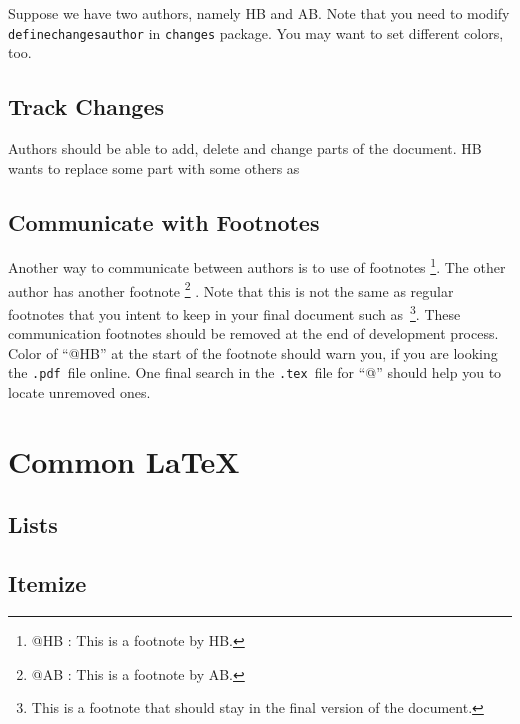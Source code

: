 \documentclass[pre,twocolumn,showkeys,longbibliography]{revtex4-1}
\makeatletter
\newcommand{\hCode}[1]{\texttt{#1}}
\newcommand{\hbFootnote}[2]{\footnote{{\color{red} @#1 : }#2}}
\theoremstyle{plain}
\theoremstyle{definition}
\theoremstyle{remark}
\newcommand{\hbDTex}{\hCode{.tex}}
\newcommand{\hbDPdf}{\hCode{.pdf}}
\makeatother
\begin{document}
Suppose we have two authors, namely HB and AB.
Note that you need to modify 
\hCode{definechangesauthor}
in 
\hCode{changes} package.
You may want to set different colors, too.



\subsection{Track Changes}

Authors should be able to add, delete and change parts of the document.
HB wants to replace some part with some others as




\subsection{Communicate with Footnotes}

Another way to communicate between authors is to use of footnotes
\hbFootnote{HB}{
	This is a footnote by HB.
}.
The other author has another footnote
\hbFootnote{AB}{
	This is a footnote by AB.
}
.
Note that this is not the same as regular footnotes that you intent to keep in your final document such as~\footnote{
	This is a footnote that should stay in the final version of the document.
}.
These communication footnotes should be removed at the end of development process.
Color of ``@HB'' at the start of the footnote should warn you, if you are looking the \hbDPdf\ file online.
One final search in the \hbDTex\ file for ``@'' should help you to locate unremoved ones.




\section{Common \LaTeX}




\subsection{Lists}




\subsection{Itemize}
\end{document}
